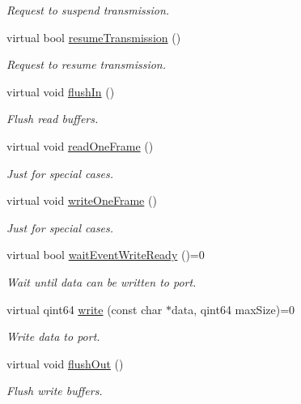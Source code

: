 \begin{DoxyCompactItemize}
\begin{DoxyCompactList}\small\item\em Request to suspend transmission. \end{DoxyCompactList}\item 
virtual bool \hyperlink{classmdt_abstract_port_ad4a04c995df881593db0a309000be7a7}{resumeTransmission} ()
\begin{DoxyCompactList}\small\item\em Request to resume transmission. \end{DoxyCompactList}\item 
virtual void \hyperlink{classmdt_abstract_port_a32329b4188db796401e4f454755acb44}{flushIn} ()
\begin{DoxyCompactList}\small\item\em Flush read buffers. \end{DoxyCompactList}\item 
virtual void \hyperlink{classmdt_abstract_port_ab1738b5b6b78743ee2d36ccf5daa7c00}{readOneFrame} ()
\begin{DoxyCompactList}\small\item\em Just for special cases. \end{DoxyCompactList}\item 
virtual void \hyperlink{classmdt_abstract_port_a2235d62d9a9e4555d41773c41cc3bc70}{writeOneFrame} ()
\begin{DoxyCompactList}\small\item\em Just for special cases. \end{DoxyCompactList}\item 
virtual bool \hyperlink{classmdt_abstract_port_a7773bc21c63ce6a275f5a0889935ac83}{waitEventWriteReady} ()=0
\begin{DoxyCompactList}\small\item\em Wait until data can be written to port. \end{DoxyCompactList}\item 
virtual qint64 \hyperlink{classmdt_abstract_port_a64d4802975a76474b9196c91f57a6d90}{write} (const char $\ast$data, qint64 maxSize)=0
\begin{DoxyCompactList}\small\item\em Write data to port. \end{DoxyCompactList}\item 
virtual void \hyperlink{classmdt_abstract_port_ad199c6310801893f1f7de2a2391606fc}{flushOut} ()
\begin{DoxyCompactList}\small\item\em Flush write buffers. \end{DoxyCompactList}\item 

\end{DoxyCompactItemize}
